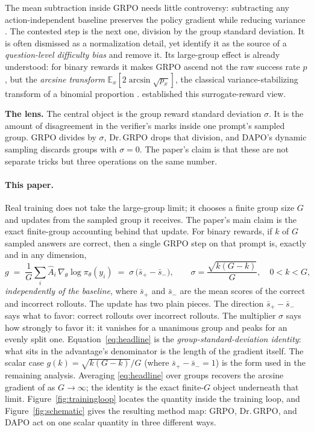 \documentclass[11pt]{article}
\theoremstyle{plain}
\theoremstyle{definition}
\newcommand{\E}{\mathbb{E}}
\newcommand{\Adv}{\hat{A}}
\begin{document}
The mean subtraction inside GRPO needs little controversy: subtracting any action-independent baseline preserves the policy gradient while reducing variance \citep{williams1992reinforce}. The contested step is the next one, division by the group standard deviation. It is often dismissed as a normalization detail, yet \citet{liu2025drgrpo} identify it as the source of a \emph{question-level difficulty bias} and remove it. Its large-group effect is already understood: for binary rewards it makes GRPO ascend not the raw success rate $p$, but the \emph{arcsine transform} $\E_x[2\arcsin\sqrt{p_x}]$, the classical variance-stabilizing transform of a binomial proportion \citep{bartlett1936,anscombe1948}. \citet{thrampoulidis2025advantageshaping} established this surrogate-reward view.

\begin{takeaway}
\textbf{The lens.} The central object is the group reward standard deviation $\sigma$. It is the amount of disagreement in the verifier's marks inside one prompt's sampled group. GRPO divides by $\sigma$, Dr.\,GRPO drops that division, and DAPO's dynamic sampling discards groups with $\sigma=0$. The paper's claim is that these are not separate tricks but three operations on the same number.
\end{takeaway}

\paragraph{This paper.} Real training does not take the large-group limit; it chooses a finite group size $G$ and updates from the sampled group it receives. The paper's main claim is the exact finite-group accounting behind that update. For binary rewards, if $k$ of $G$ sampled answers are correct, then a single GRPO step on that prompt is, exactly and in any dimension,
\begin{equation}
\label{eq:headline}
g\;=\;\frac1G\sum_i \Adv_i\,\nabla_\theta\log\pi_\theta(y_i)\;=\;\sigma\,\big(\bar s_+-\bar s_-\big),
\qquad \sigma=\frac{\sqrt{k(G-k)}}{G},\quad 0<k<G,
\end{equation}
\emph{independently of the baseline}, where $\bar s_+$ and $\bar s_-$ are the mean scores of the correct and incorrect rollouts. The update has two plain pieces. The direction $\bar s_+-\bar s_-$ says what to favor: correct rollouts over incorrect rollouts. The multiplier $\sigma$ says how strongly to favor it: it vanishes for a unanimous group and peaks for an evenly split one. Equation~\eqref{eq:headline} is the \emph{group-standard-deviation identity}: what sits in the advantage's denominator is the length of the gradient itself. The scalar case $g(k)=\sqrt{k(G-k)}/G$ (where $\bar s_+-\bar s_-=1$) is the form used in the remaining analysis. Averaging \eqref{eq:headline} over groups recovers the arcsine gradient of \citet{thrampoulidis2025advantageshaping} as $G\to\infty$; the identity is the exact finite-$G$ object underneath that limit. Figure~\ref{fig:trainingloop} locates the quantity inside the training loop, and Figure~\ref{fig:schematic} gives the resulting method map: GRPO, Dr.\,GRPO, and DAPO act on one scalar quantity in three different ways.
\end{document}
